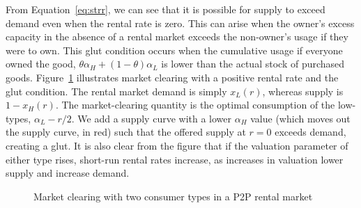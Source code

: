 \documentclass[11pt]{article}
\begin{document}
From Equation~\ref{eq:strr}, we can see that it is possible for supply to exceed demand even when the rental rate is zero. 
This can arise when the owner's excess capacity in the absence of a rental market exceeds the non-owner's usage if they were to own. 
This glut condition occurs when the cumulative usage if everyone owned the good, $\theta \alpha_H + (1-\theta)\alpha_L$ is lower than the actual stock of purchased goods. 
Figure~\ref{fig:market_clearing} illustrates market clearing with a positive rental rate and the glut condition. 
The rental market demand is simply $x_L(r)$, whereas supply is $1-x_H(r)$. 
The market-clearing quantity is the optimal consumption of the low-types, $\alpha_L - r/2$. 
We add a supply curve with a lower $\alpha_H$ value (which moves out the supply curve, in red) such that the offered supply at $r = 0$ exceeds demand, creating a glut.  
It is also clear from the figure that if the valuation parameter of either type rises, short-run rental rates increase, as increases in valuation lower supply and increase demand. 
 
\newcommand*{\alphaH}{0.80}%
\newcommand*{\alphaL}{0.50}%
\newcommand*{\alphaHp}{0.40}
\pgfmathsetmacro{\r}{-1 + \alphaH + \alphaL}%
\pgfmathsetmacro{\Q}{\alphaL - \r/2}
\begin{figure} 
\caption{Market clearing with two consumer types in a P2P rental market} 
\label{fig:market_clearing} 
\begin{center}
\end{center}
\end{figure} 
\end{document}

